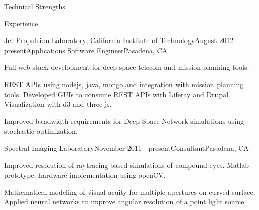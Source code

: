 \documentclass{resume} %
\begin{document}

\begin{rSection}{Technical Strengths}


\end{rSection}


\begin{rSection}{Experience}

\begin{rSubsection}{Jet Propulsion Laboratory, California Institute of Technology}{August 2012 - present}{Applications Software Engineer}{Pasadena, CA}
\item Full web stack development for deep space telecom and mission planning tools. 
\item REST APIs using nodejs, java, mongo and integration with mission planning tools. Developed GUIs to consume REST APIs with Liferay and Drupal. Visualization with d3 and three js.
\item Improved bandwidth requirements for Deep Space Network simulations using stochastic optimization.

\end{rSubsection}


\begin{rSubsection}{Spectral Imaging Laboratory}{November 2011 - present}{Consultant}{Pasadena, CA}
\item Improved resolution of raytracing-based simulations of compound eyes. Matlab prototype, hardware implementation using openCV.
\item Mathematical modeling of visual acuity for multiple apertures on curved surface. Applied neural networks to improve angular resolution of a point light source. 
\end{rSubsection}



\end{rSection}
\end{document}
